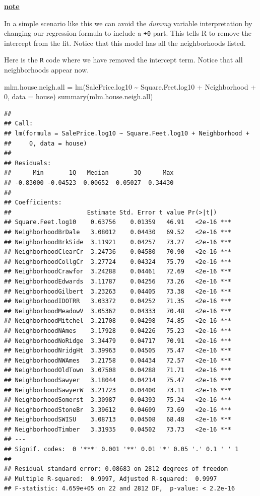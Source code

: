 \documentclass[
]{book}
\newenvironment{Shaded}{\begin{snugshade}}{\end{snugshade}}
\newcommand{\AttributeTok}[1]{\textcolor[rgb]{0.77,0.63,0.00}{#1}}
\newcommand{\DecValTok}[1]{\textcolor[rgb]{0.00,0.00,0.81}{#1}}
\newcommand{\FunctionTok}[1]{\textcolor[rgb]{0.00,0.00,0.00}{#1}}
\newcommand{\NormalTok}[1]{#1}
\newcommand{\OtherTok}[1]{\textcolor[rgb]{0.56,0.35,0.01}{#1}}
\newcommand{\SpecialCharTok}[1]{\textcolor[rgb]{0.00,0.00,0.00}{#1}}
\newenvironment{rmdblock}[1]
  {\begin{shaded*}
  \centerline{\underline{\textbf{#1}}}

  }
  {
  \end{shaded*}
  }
\newenvironment{note}
  {\begin{rmdblock}{note}}
  {\end{rmdblock}}
\theoremstyle{definition}
\theoremstyle{definition}
\theoremstyle{definition}
\theoremstyle{definition}
\theoremstyle{remark}
\begin{document}
\begin{note}
In a simple scenario like this we can avoid the \emph{dummy} variable interpretation by changing our regression formula to include a \texttt{+0} part. This tells R to remove the intercept from the fit. Notice that this model has all the neighborhoods listed.
\end{note}

Here is the \texttt{R} code where we have removed the intercept term. Notice that all neighborhoods appear now.

\begin{Shaded}
\begin{Highlighting}[]
\NormalTok{mlm.house.neigh.all }\OtherTok{=} \FunctionTok{lm}\NormalTok{(SalePrice.log10 }\SpecialCharTok{\textasciitilde{}}\NormalTok{ Square.Feet.log10 }\SpecialCharTok{+}\NormalTok{ Neighborhood }\SpecialCharTok{+} \DecValTok{0}\NormalTok{,}
    \AttributeTok{data =}\NormalTok{ house)}
\FunctionTok{summary}\NormalTok{(mlm.house.neigh.all)}
\end{Highlighting}
\end{Shaded}

\begin{verbatim}
## 
## Call:
## lm(formula = SalePrice.log10 ~ Square.Feet.log10 + Neighborhood + 
##     0, data = house)
## 
## Residuals:
##      Min       1Q   Median       3Q      Max 
## -0.83000 -0.04523  0.00652  0.05027  0.34430 
## 
## Coefficients:
##                     Estimate Std. Error t value Pr(>|t|)    
## Square.Feet.log10    0.63756    0.01359   46.91   <2e-16 ***
## NeighborhoodBrDale   3.08012    0.04430   69.52   <2e-16 ***
## NeighborhoodBrkSide  3.11921    0.04257   73.27   <2e-16 ***
## NeighborhoodClearCr  3.24736    0.04580   70.90   <2e-16 ***
## NeighborhoodCollgCr  3.27724    0.04324   75.79   <2e-16 ***
## NeighborhoodCrawfor  3.24288    0.04461   72.69   <2e-16 ***
## NeighborhoodEdwards  3.11787    0.04256   73.26   <2e-16 ***
## NeighborhoodGilbert  3.23263    0.04405   73.38   <2e-16 ***
## NeighborhoodIDOTRR   3.03372    0.04252   71.35   <2e-16 ***
## NeighborhoodMeadowV  3.05362    0.04333   70.48   <2e-16 ***
## NeighborhoodMitchel  3.21708    0.04298   74.85   <2e-16 ***
## NeighborhoodNAmes    3.17928    0.04226   75.23   <2e-16 ***
## NeighborhoodNoRidge  3.34479    0.04717   70.91   <2e-16 ***
## NeighborhoodNridgHt  3.39963    0.04505   75.47   <2e-16 ***
## NeighborhoodNWAmes   3.21758    0.04434   72.57   <2e-16 ***
## NeighborhoodOldTown  3.07508    0.04288   71.71   <2e-16 ***
## NeighborhoodSawyer   3.18044    0.04214   75.47   <2e-16 ***
## NeighborhoodSawyerW  3.21723    0.04400   73.11   <2e-16 ***
## NeighborhoodSomerst  3.30987    0.04393   75.34   <2e-16 ***
## NeighborhoodStoneBr  3.39612    0.04609   73.69   <2e-16 ***
## NeighborhoodSWISU    3.08713    0.04508   68.48   <2e-16 ***
## NeighborhoodTimber   3.31935    0.04502   73.73   <2e-16 ***
## ---
## Signif. codes:  0 '***' 0.001 '**' 0.01 '*' 0.05 '.' 0.1 ' ' 1
## 
## Residual standard error: 0.08683 on 2812 degrees of freedom
## Multiple R-squared:  0.9997, Adjusted R-squared:  0.9997 
## F-statistic: 4.659e+05 on 22 and 2812 DF,  p-value: < 2.2e-16
\end{verbatim}
\end{document}
